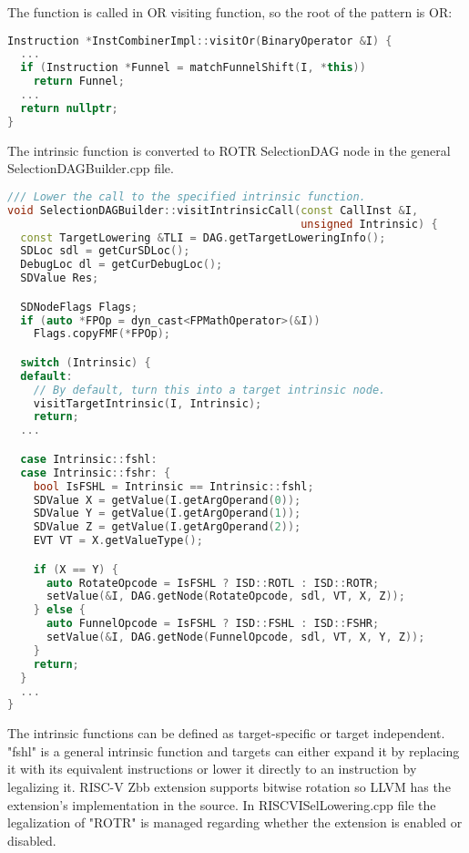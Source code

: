 The function is called in OR visiting function, so the root of the pattern is OR:

\begin{lstlisting}[language=C++, caption={Funnel Shift Right Pattern Function Called}]
Instruction *InstCombinerImpl::visitOr(BinaryOperator &I) {
  ...
  if (Instruction *Funnel = matchFunnelShift(I, *this))
    return Funnel;
  ...
  return nullptr;
}


\end{lstlisting}

The intrinsic function is converted to ROTR SelectionDAG node in the general SelectionDAGBuilder.cpp file.
\begin{lstlisting}[language=C++, caption={Funnel Shift Intrinsic converted to ROTL}]
/// Lower the call to the specified intrinsic function.
void SelectionDAGBuilder::visitIntrinsicCall(const CallInst &I,
                                             unsigned Intrinsic) {
  const TargetLowering &TLI = DAG.getTargetLoweringInfo();
  SDLoc sdl = getCurSDLoc();
  DebugLoc dl = getCurDebugLoc();
  SDValue Res;

  SDNodeFlags Flags;
  if (auto *FPOp = dyn_cast<FPMathOperator>(&I))
    Flags.copyFMF(*FPOp);

  switch (Intrinsic) {
  default:
    // By default, turn this into a target intrinsic node.
    visitTargetIntrinsic(I, Intrinsic);
    return;
  ...

  case Intrinsic::fshl:
  case Intrinsic::fshr: {
    bool IsFSHL = Intrinsic == Intrinsic::fshl;
    SDValue X = getValue(I.getArgOperand(0));
    SDValue Y = getValue(I.getArgOperand(1));
    SDValue Z = getValue(I.getArgOperand(2));
    EVT VT = X.getValueType();

    if (X == Y) {
      auto RotateOpcode = IsFSHL ? ISD::ROTL : ISD::ROTR;
      setValue(&I, DAG.getNode(RotateOpcode, sdl, VT, X, Z));
    } else {
      auto FunnelOpcode = IsFSHL ? ISD::FSHL : ISD::FSHR;
      setValue(&I, DAG.getNode(FunnelOpcode, sdl, VT, X, Y, Z));
    }
    return;
  }
  ...
}

\end{lstlisting}


The intrinsic functions can be defined as target-specific or target independent. "fshl" is a general intrinsic function and targets can either expand it by replacing it with its equivalent instructions or lower it directly to an instruction by legalizing it. RISC-V Zbb extension supports bitwise rotation so LLVM has the extension's implementation in the source. In RISCVISelLowering.cpp file the legalization of "ROTR" is managed regarding whether the extension is enabled or disabled.

